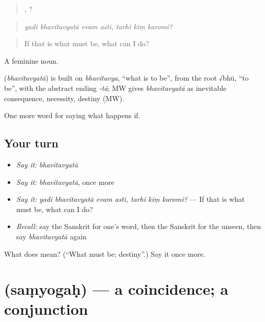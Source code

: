 \begin{quote}
   ,   ?
\end{quote}

\begin{quote}
\emph{yadi bhavitavyatā evam asti, tarhi kiṃ karomi?}
\end{quote}

\begin{quote}
If that is what must be, what can I do?
\end{quote}

A feminine noun.

\begin{cousinweb}
\textbf{} (\emph{bhavitavyatā}) is built on \emph{bhavitavya}, \textquotedblleft{}what is to be\textquotedblright{}, from the root √bhū, \textquotedblleft{}to be\textquotedblright{}, with the abstract ending \emph{-tā}; MW gives \emph{bhavitavyatā} as inevitable consequence, necessity, destiny (MW).
\end{cousinweb}

\begin{grammarlens}[title={What you've built}]
One more word for saying what happens if.
\end{grammarlens}

\subsection*{Your turn}
\begin{itemize}
\raggedright
  \item \emph{Say it:} \emph{bhavitavyatā}
  \item \emph{Say it:} \emph{bhavitavyatā}, once more
  \item \emph{Say it:} \emph{yadi bhavitavyatā evam asti, tarhi kiṃ karomi?} — If that is what must be, what can I do?
  \item \emph{Recall:} say the Sanskrit for one's word, then the Sanskrit for the unseen, then say \emph{bhavitavyatā} again
\end{itemize}

\begin{tcolorbox}[breakable,colback=teal!4,colframe=teal!35!black,title={Before you move on}]
What does  mean? (\textquotedblleft{}What must be; destiny\textquotedblright{}.) Say it once more.
\end{tcolorbox}
\section[\texorpdfstring{\sk{संयोगः} (saṃyogaḥ)}{संयोगः (saṃyogaḥ)}]{ (saṃyogaḥ) — a coincidence; a conjunction}

